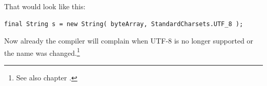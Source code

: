 That would look like this:
\begin{lstlisting}
final String s = new String( byteArray, StandardCharsets.UTF_8 );
\end{lstlisting}

Now already the compiler will complain when UTF-8 is no longer supported or the name was changed.\footnote{See also chapter .}
